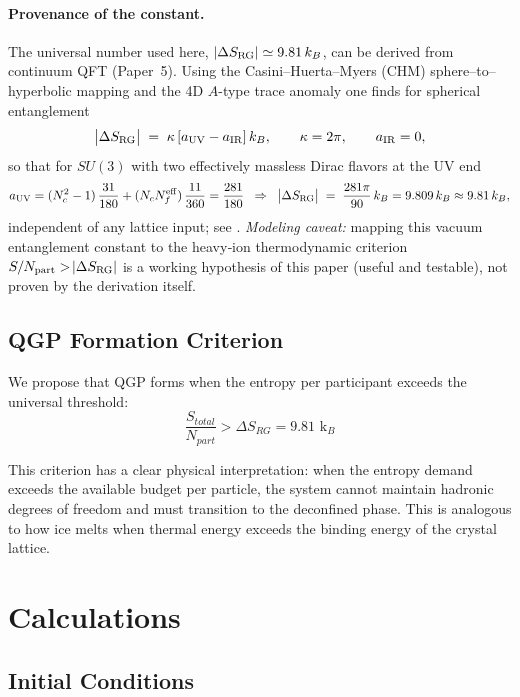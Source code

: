 \documentclass[12pt,a4paper]{article}
\begin{document}
\paragraph{Provenance of the constant.}
The universal number used here, $|\Delta S_{\rm RG}| \simeq 9.81\,k_B$, can be derived from continuum QFT (Paper~5). Using the Casini–Huerta–Myers (CHM) sphere–to–hyperbolic mapping and the 4D $A$-type trace anomaly one finds for spherical entanglement
\begin{equation}
\big|\Delta S_{\rm RG}\big| \;=\; \kappa\,[a_{\rm UV}-a_{\rm IR}]\,k_B,\qquad \kappa=2\pi,\qquad a_{\rm IR}=0,
\end{equation}
so that for $SU(3)$ with two effectively massless Dirac flavors at the UV end
\begin{equation}
a_{\rm UV} = (N_c^2-1)\,\frac{31}{180} + (N_c N_f^{\rm eff})\,\frac{11}{360}
= \frac{281}{180} \;\;\Rightarrow\;\;
\big|\Delta S_{\rm RG}\big| \;=\; \frac{281\pi}{90}\,k_B = 9.809\,k_B \approx 9.81\,k_B,
\end{equation}
independent of any lattice input; see \cite{CHM,KS,Anselmi1998,TupayP5}. 
\emph{Modeling caveat:} mapping this vacuum entanglement constant to the heavy‑ion thermodynamic criterion $S/N_{\rm part}>\!|\Delta S_{\rm RG}|$ is a working hypothesis of this paper (useful and testable), not proven by the derivation itself.


\subsection{QGP Formation Criterion}

We propose that QGP forms when the entropy per participant exceeds the universal threshold:
\begin{equation}
\frac{S_{total}}{N_{part}} > \Delta S_{RG} = 9.81 \text{ k}_B
\label{eq:qgp_criterion}
\end{equation}

This criterion has a clear physical interpretation: when the entropy demand exceeds the available budget per particle, the system cannot maintain hadronic degrees of freedom and must transition to the deconfined phase. This is analogous to how ice melts when thermal energy exceeds the binding energy of the crystal lattice.

\section{Calculations}

\subsection{Initial Conditions}
\end{document}

